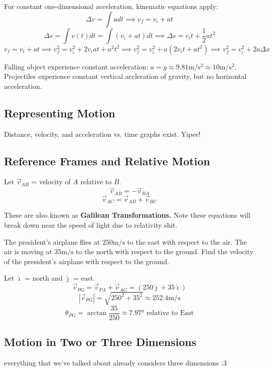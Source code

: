 \documentclass{article}
\begin{document}
For constant one-dimensional acceleration, kinematic equations apply:
\[\Delta v = \int adt \implies v_f = v_i + at\]
\[\Delta s = \int v(t)dt = \int (v_i + at)dt \implies \Delta s = v_it + \frac{1}{2}at^2\]
\[v_f = v_i + at \implies v_f^2 = v_i^2 + 2v_iat + a^2t^2 \implies v_f^2 = v_i^2 + a(2v_it + at^2) \implies v_f^2 = v_i^2 + 2a\Delta x\]

Falling object experience constant acceleration: $a = g \approx 9.81\unit{\metre \per \second \squared} \approx 10\unit{\metre \per \second \squared}$.
Projectiles experience constant vertical accleration of gravity, but no horizontal acceleration.

\subsection{Representing Motion}
Distance, velocity, and acceleration vs. time graphs exist. Yipee!

\subsection{Reference Frames and Relative Motion}
Let $\vec{v}_{AB}$ = velocity of $A$ relative to $B$.
\[\vec{v}_{AB} = -\vec{v}_{BA}\]
\[\vec{v}_{AC} = \vec{v}_{AB} + \vec{v}_{BC}\]

These are also known as \textbf{Galilean Transformations.} Note these equations will break down near the speed of light due to relativity shit.

\begin{example}
    The president's airplane flies at $250 \unit{\metre \per \second}$ to the east with respect to the air.
    The air is moving at $35 \unit{\metre \per \second}$ to the north with respect to the ground.
    Find the velocity of the president's airplane with respect to the ground.
\end{example}
\begin{answer}
    Let $\hat{\imath}$ = north and $\hat{\jmath}$ = east.
    \[\vec{v}_{PG} = \vec{v}_{PA} + \vec{v}_{AG} = (250\hat{\jmath} + 35 \hat{\imath})\]
    \[|\vec{v}_{PG}| = \sqrt{250^2 + 35^2} \approx 252.4\unit{\metre \per \second}\]
    \[\theta_{PG} = \arctan{\frac{35}{250}} \approx 7.97\unit{\degree} \textrm{ relative to East}\]
\end{answer}

\subsection{Motion in Two or Three Dimensions}
everything that we've talked about already considers three dimensions :3
\end{document}
